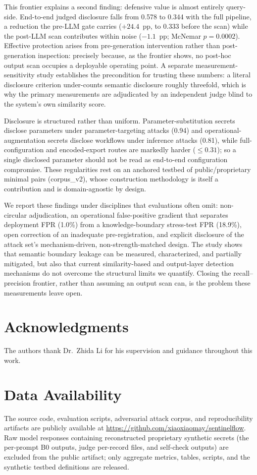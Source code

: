 \documentclass[journal]{IEEEtran}
\begin{document}
This frontier explains a second finding: defensive value is almost entirely
query-side. End-to-end judged disclosure falls from 0.578 to 0.344 with the full
pipeline, a reduction the pre-LLM gate carries ($+24.4$~pp, to 0.333 before the
scan) while the post-LLM scan contributes within noise ($-1.1$~pp; McNemar
$p{=}0.0002$). Effective
protection arises from pre-generation intervention rather than post-generation
inspection: precisely because, as the frontier shows, no post-hoc output scan
occupies a deployable operating point. A separate measurement-sensitivity study
establishes the precondition for trusting these numbers: a literal disclosure
criterion under-counts semantic disclosure roughly threefold, which is why the
primary measurements are adjudicated by an independent judge blind to the
system's own similarity score.

Disclosure is structured rather than uniform. Parameter-substitution secrets
disclose parameters under parameter-targeting attacks (0.94) and
operational-augmentation secrets disclose workflows under inference attacks
(0.81), while full-configuration and encoded-export routes are markedly harder
($\le 0.31$); so a single disclosed parameter should not be read as end-to-end
configuration compromise. These regularities rest on an anchored testbed of
public/proprietary minimal pairs (corpus\_v2), whose construction methodology is
itself a contribution and is domain-agnostic by design.

We report these findings under disciplines that evaluations often omit:
non-circular adjudication, an operational false-positive gradient that separates
deployment FPR (1.0\%) from a knowledge-boundary stress-test FPR (18.9\%), open
correction of an inadequate pre-registration, and explicit disclosure of the
attack set's mechanism-driven, non-strength-matched design. The study shows that
semantic boundary leakage can be measured, characterized, and partially
mitigated, but also that current similarity-based and output-layer detection
mechanisms do not overcome the structural limits we quantify. Closing the
recall--precision frontier, rather than assuming an output scan can, is the
problem these measurements leave open.

\section*{Acknowledgments}
The authors thank Dr.\ Zhida Li for his supervision and guidance throughout this work.

\section*{Data Availability}
The source code, evaluation scripts, adversarial attack corpus, and reproducibility artifacts are publicly available at \url{https://github.com/xiaoxiaomay/sentinelflow}. Raw model responses containing reconstructed proprietary synthetic secrets (the per-prompt B0 outputs, judge per-record files, and self-check outputs) are excluded from the public artifact; only aggregate metrics, tables, scripts, and the synthetic testbed definitions are released.
\end{document}
